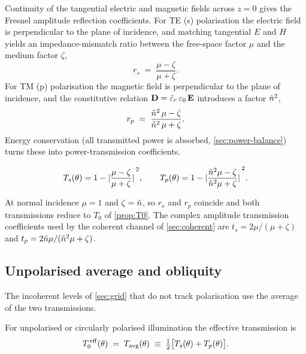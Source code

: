 Continuity of the tangential electric and magnetic fields across $z=0$ gives the
Fresnel amplitude reflection coefficients. For TE (s) polarisation the electric
field is perpendicular to the plane of incidence, and matching tangential $E$
and $H$ yields an impedance-mismatch ratio between the free-space factor $\mu$
and the medium factor $\zeta$,
\begin{equation}\label{eq:rs}
  r_s \;=\; \frac{\mu-\zeta}{\mu+\zeta}.
\end{equation}
For TM (p) polarisation the magnetic field is perpendicular to the plane of
incidence, and the constitutive relation $\mathbf{D}=\tilde{\varepsilon}_r\,\varepsilon_0\,\mathbf{E}$
introduces a factor $\tilde{n}^2$,
\begin{equation}\label{eq:rp}
  r_p \;=\; \frac{\tilde{n}^2\,\mu-\zeta}{\tilde{n}^2\,\mu+\zeta}.
\end{equation}
Energy conservation (all transmitted power is absorbed, \cref{sec:power-balance})
turns these into power-transmission coefficients.

\begin{definition}\label{def:Ts-Tp}
\begin{equation}\label{eq:Ts-Tp}
  T_s(\theta) = 1-\abs*{\frac{\mu-\zeta}{\mu+\zeta}}^2,
  \qquad
  T_p(\theta) = 1-\abs*{\frac{\tilde{n}^2\mu-\zeta}{\tilde{n}^2\mu+\zeta}}^2.
\end{equation}
\end{definition}

At normal incidence $\mu=1$ and $\zeta=\tilde{n}$, so $r_s$ and $r_p$ coincide and
both transmissions reduce to $T_0$ of \cref{prop:T0}. The complex amplitude
transmission coefficients used by the coherent channel of \cref{sec:coherent}
are $t_s = 2\mu/(\mu+\zeta)$ and $t_p = 2\tilde{n}\mu/(\tilde{n}^2\mu+\zeta)$.

\subsection{Unpolarised average and obliquity}\label{sec:Tavg}

The incoherent levels of \cref{sec:grid} that do not track polarisation use the
average of the two transmissions.

\begin{definition}\label{def:Tavg}
For unpolarised or circularly polarised illumination the effective transmission
is
\begin{equation}\label{eq:Tavg-def}
  T_0^{\,\mathrm{eff}}(\theta) \;=\; T_{\mathrm{avg}}(\theta)
  \;\equiv\; \tfrac{1}{2}\bigl[T_s(\theta)+T_p(\theta)\bigr].
\end{equation}
\end{definition}

